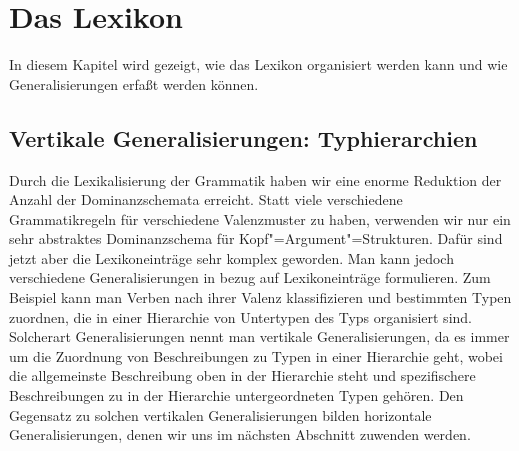 

\chapter{Das Lexikon}
\label{chap-lexikon}

In diesem Kapitel wird gezeigt, wie das Lexikon organisiert werden kann
und wie Generalisierungen erfaßt werden können.


\section{Vertikale Generalisierungen: Typhierarchien}

Durch die Lexikalisierung der Grammatik haben wir eine enorme Reduktion der Anzahl der Dominanzschemata
erreicht. Statt viele verschiedene Grammatikregeln für verschiedene Valenzmuster zu haben, verwenden
wir nur ein sehr abstraktes Dominanzschema für Kopf"=Argument"=Strukturen. Dafür sind jetzt aber
die Lexikoneinträge sehr komplex geworden. Man kann jedoch verschiedene Generalisierungen in bezug auf
Lexikoneinträge formulieren. Zum Beispiel kann man Verben nach ihrer Valenz klassifizieren
und bestimmten Typen zuordnen, die in einer Hierarchie von Untertypen des Typs 
organisiert sind. Solcherart Generalisierungen nennt man vertikale Generalisierungen, da
es immer um die Zuordnung von Beschreibungen zu Typen in einer Hierarchie geht, wobei die
allgemeinste Beschreibung oben in der Hierarchie steht und spezifischere Beschreibungen
zu in der Hierarchie untergeordneten Typen gehören. Den Gegensatz zu solchen vertikalen
Generalisierungen bilden horizontale Generalisierungen, denen wir uns im nächsten Abschnitt zuwenden werden.


